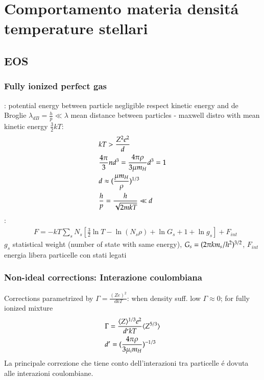 \documentclass[main.tex]{subfiles}
\begin{document}
\chapter{Comportamento materia densit\'a temperature stellari}

\section{EOS}

\subsection{Fully ionized perfect gas}

: potential energy between particle negligible respect kinetic energy and de Broglie $\lambda_{dB}=\frac{h}{p}\ll\lambda$ mean distance between particles - maxwell distro with mean kinetic energy $\frac{3}{2}kT$:
\begin{align*}
&kT>\frac{Z^2e^2}{d}\\
&\frac{4\pi}{3}nd^3=\frac{4\pi\rho}{3\mu m_H}d^3=1\\
&d\approx(\frac{\mu m_H}{\rho})^{1/3}\\
&\frac{h}{p}=\frac{h}{\sqrt{2mkT}}\ll d
\end{align*}
:
\begin{align*}
&F=-kT\sum_sN_s[\frac{3}{2}\ln{T}-\ln{(N_s\rho)}+\ln{G_s}+1+\ln{g_s}]+F_{int}
\end{align*}
$g_s$ statistical weight (number of state with same energy), $G_s=(2\pi km_s/h^2)^{3/2}$, $F_{int}$ energia libera particelle con stati legati

\subsection{Non-ideal corrections: Interazione coulombiana}

Corrections parametrized by $\Gamma=\frac{(Ze)^2}{dkT}$: when density suff. low $\Gamma\approx0$; for fully ionized mixture
\begin{align*}
&\Gamma=\frac{\langle Z \rangle^{1/3}e^2}{d'kT}\langle Z^{5/3} \rangle\\
&d'=(\frac{4\pi\rho}{3\mu_im_H})^{-1/3}
\end{align*}
La principale correzione che tiene conto dell'interazioni tra particelle \'e dovuta alle interazioni coulombiane.

\begin{workout}

\end{workout}
\end{document}
